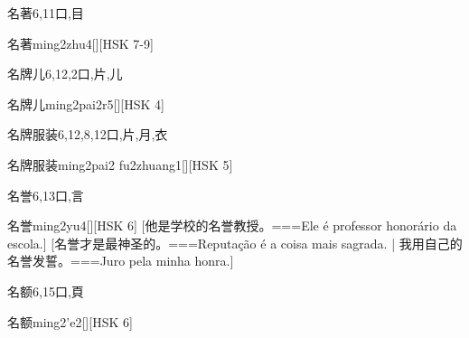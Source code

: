 \begin{Entry}{名著}{6,11}{⼝,⽬}
  \begin{Phonetics}{名著}{ming2zhu4}[][HSK 7-9]
  \end{Phonetics}
\end{Entry}

\begin{Entry}{名牌儿}{6,12,2}{⼝,⽚,⼉}
  \begin{Phonetics}{名牌儿}{ming2pai2r5}[][HSK 4]
  \end{Phonetics}
\end{Entry}

\begin{Entry}{名牌服装}{6,12,8,12}{⼝,⽚,⽉,⾐}
  \begin{Phonetics}{名牌服装}{ming2pai2 fu2zhuang1}[][HSK 5]
  \end{Phonetics}
\end{Entry}

\begin{Entry}{名誉}{6,13}{⼝,⾔}
  \begin{Phonetics}{名誉}{ming2yu4}[][HSK 6]
    [他是学校的名誉教授。===Ele é professor honorário da escola.]
    [名誉才是最神圣的。===Reputação é a coisa mais sagrada. | 我用自己的名誉发誓。===Juro pela minha honra.]
  \end{Phonetics}
\end{Entry}

\begin{Entry}{名额}{6,15}{⼝,⾴}
  \begin{Phonetics}{名额}{ming2'e2}[][HSK 6]
  \end{Phonetics}
\end{Entry}

